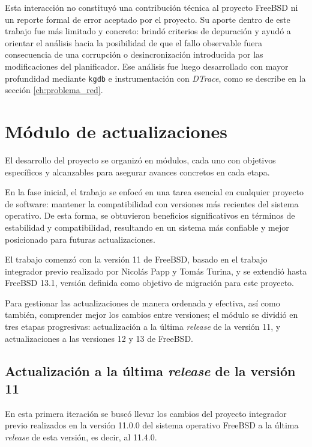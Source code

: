 Esta interacción no constituyó una contribución técnica al proyecto FreeBSD ni un reporte formal de error aceptado por el proyecto. Su aporte dentro de este trabajo fue más limitado y concreto: brindó criterios de depuración y ayudó a orientar el análisis hacia la posibilidad de que el fallo observable fuera consecuencia de una corrupción o desincronización introducida por las modificaciones del planificador. Ese análisis fue luego desarrollado con mayor profundidad mediante \texttt{kgdb} e instrumentación con \textit{DTrace}, como se describe en la sección \ref{ch:problema_red}.\par

\section{Módulo de actualizaciones}

El desarrollo del proyecto se organizó en módulos, cada uno con objetivos específicos y alcanzables para asegurar avances concretos en cada etapa.\par

En la fase inicial, el trabajo se enfocó en una tarea esencial en cualquier proyecto de software: mantener la compatibilidad con versiones más recientes del sistema operativo. De esta forma, se obtuvieron beneficios significativos en términos de estabilidad y compatibilidad, resultando en un sistema más confiable y mejor posicionado para futuras actualizaciones.\par

El trabajo comenzó con la versión 11 de FreeBSD, basado en el trabajo integrador previo realizado por Nicolás Papp y Tomás Turina, y se extendió hasta FreeBSD 13.1, versión definida como objetivo de migración para este proyecto.\par

Para gestionar las actualizaciones de manera ordenada y efectiva, así como también, comprender mejor los cambios entre versiones; el módulo se dividió en tres etapas progresivas: actualización a la última \textit{release} de la versión 11, y actualizaciones a las versiones 12 y 13 de FreeBSD.\par


\subsection{Actualización a la última \textit{release} de la versión 11}

En esta primera iteración se buscó llevar los cambios del proyecto integrador previo realizados en la versión 11.0.0 del sistema operativo FreeBSD a la última \textit{release} de esta versión, es decir, al 11.4.0.\par


